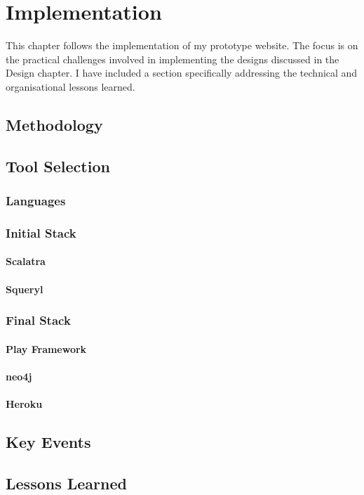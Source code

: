 \chapter{Implementation}
  This chapter follows the implementation of my prototype website. The focus is on the practical challenges involved in implementing the designs discussed in the Design chapter. I have included a section specifically addressing the technical and organisational lessons learned.

  \section{Methodology}
  \section{Tool Selection}
    \subsection{Languages}
    \subsection{Initial Stack}
      \subsubsection{Scalatra}
      \subsubsection{Squeryl}
    \subsection{Final Stack}
      \subsubsection{Play Framework}
      \subsubsection{neo4j}
      \subsubsection{Heroku}
  \section{Key Events}
  \section{Lessons Learned}
